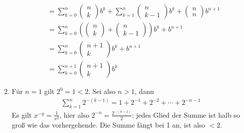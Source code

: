 \documentclass{article}
\begin{document}
\begin{enumerate}
\begin{align*}
        &= \sum_{k = 0}^{n} \begin{pmatrix}
            n \\k
        \end{pmatrix}b^k + \sum_{k = 1}^{n} \begin{pmatrix}
            n \\k - 1
        \end{pmatrix}b^{k} + \begin{pmatrix} n \\ n \end{pmatrix}b^{n + 1} \\
        &= \sum_{k = 0}^{n} \left(\begin{pmatrix}
            n \\k
        \end{pmatrix} + \begin{pmatrix*}
            n \\ k - 1
        \end{pmatrix*}\right)b^k + b^{n + 1} \\
        &= \sum_{k = 0}^{n} \begin{pmatrix*}
            n + 1 \\
            k
        \end{pmatrix*}b^k + b^{n + 1} \\
        &= \sum_{k = 0}^{n + 1} \begin{pmatrix*}
            n + 1 \\
            k
        \end{pmatrix*}b^k
    \end{align*}

    \item Für $n = 1$ gilt $2^{0} = 1 < 2$. Sei also $n > 1$, dann
    \begin{align*}
        \sum_{k = 1}^n 2^{-(k - 1)} = 1 + 2^{-1} + 2^{-2} + \cdots + 2^{-{n - 1}}
    \end{align*}
    Es gilt $x^{-y} = \frac{1}{x^y}$, hier also $2^{-n} = \frac{2^{-(n - 1)}}{2}$; jedes Glied der Summe ist halb so groß wie das vorhergehende. Die Summe fängt bei 1 an, ist also $< 2$.
\end{enumerate}
\end{document}

